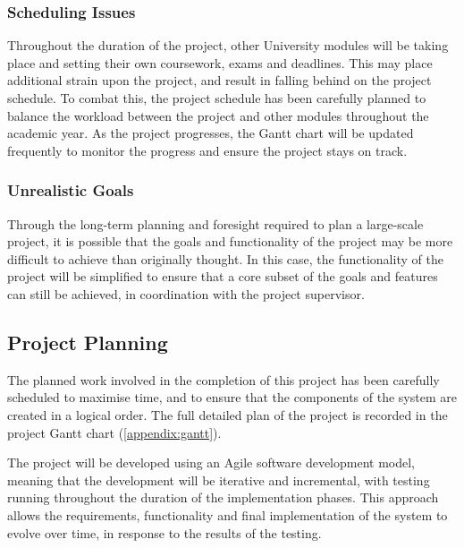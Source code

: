 \documentclass[12pt,a4paper]{article}
\begin{document}
\subsubsection{Scheduling Issues}
Throughout the duration of the project, other University modules will be taking place and setting their own coursework, exams and deadlines. This may place additional strain upon the project, and result in falling behind on the project schedule. To combat this, the project schedule has been carefully planned to balance the workload between the project and other modules throughout the academic year. As the project progresses, the Gantt chart will be updated frequently to monitor the progress and ensure the project stays on track.

\subsubsection{Unrealistic Goals}
Through the long-term planning and foresight required to plan a large-scale project, it is possible that the goals and functionality of the project may be more difficult to achieve than originally thought. In this case, the functionality of the project will be simplified to ensure that a core subset of the goals and features can still be achieved, in coordination with the project supervisor.

\subsection{Project Planning}

The planned work involved in the completion of this project has been carefully scheduled to maximise time, and to ensure that the components of the system are created in a logical order. The full detailed plan of the project is recorded in the project Gantt chart (\autoref{appendix:gantt}).

The project will be developed using an Agile software development model, meaning that the development will be iterative and incremental, with testing running throughout the duration of the implementation phases. This approach allows the requirements, functionality and final implementation of the system to evolve over time, in response to the results of the testing.
\end{document}
